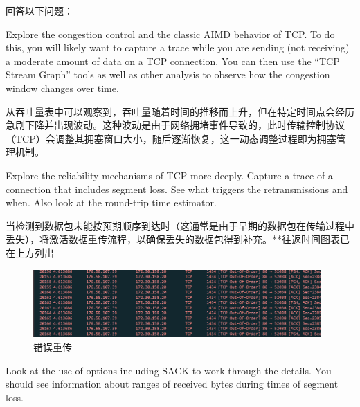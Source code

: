 \documentclass{article}
\begin{document}
	回答以下问题：
	
	\begin{tcolorbox}[title = {Question-1}, colback = red!25!white, colframe = red!75!black]
		Explore the congestion control and the classic AIMD behavior of TCP.  To do this, you will likely want to capture a trace while you are sending (not receiving) a moderate amount of data on a TCP connection. You can then use the “TCP Stream Graph” tools as well as other analysis to observe how the congestion window changes over time.
	\end{tcolorbox}
	
	\begin{tcolorbox}[title = {Answer-1}, colback = blue!25!white, colframe = blue!75!black]
		从吞吐量表中可以观察到，吞吐量随着时间的推移而上升，但在特定时间点会经历急剧下降并出现波动。这种波动是由于网络拥堵事件导致的，此时传输控制协议（TCP）会调整其拥塞窗口大小，随后逐渐恢复，这一动态调整过程即为拥塞管理机制。
	\end{tcolorbox}
	
	\begin{tcolorbox}[title = {Question-2}, colback = red!25!white, colframe = red!75!black]
		Explore the reliability mechanisms of TCP more deeply. Capture a trace of a connection that includes segment loss. See what triggers the retransmissions and when. Also look at the round-trip time estimator.
	\end{tcolorbox}
	
	\begin{tcolorbox}[title = {Answer-2}, colback = blue!25!white, colframe = blue!75!black]
		当检测到数据包未能按预期顺序到达时（这通常是由于早期的数据包在传输过程中丢失），将激活数据重传流程，以确保丢失的数据包得到补充。**往返时间图表已在上方列出
		
		\begin{figure}[H]
			\centering
			\includegraphics[width=11cm]{images/30.错误重传.png}
			\caption{错误重传}
		\end{figure}
	\end{tcolorbox}
	
	\begin{tcolorbox}[title = {Question-3}, colback = red!25!white, colframe = red!75!black]
		Look at the use of options including SACK to work through the details. You should see information about ranges of received bytes during times of segment loss.
	\end{tcolorbox}
	
\end{document}
